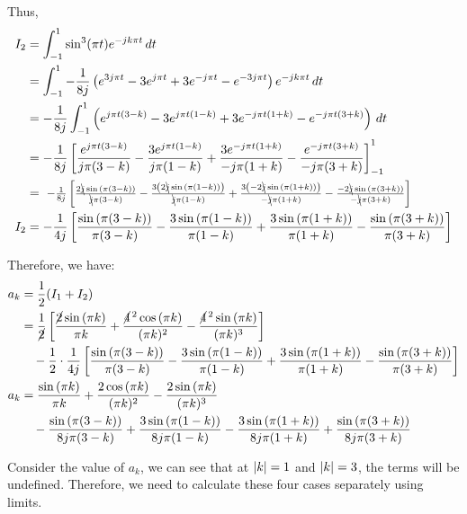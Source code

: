 \documentclass[a4paper, 10pt]{article}
\begin{document}
\begin{tosubmit}
Thus, 
\begin{align*}
    I_2 &= \int_{-1}^{1} \sin^3(\pi t) e^{-j k \pi t} \,dt \\
    &= \int_{-1}^{1} -\frac{1}{8j} \paren{ e^{3j \pi t} - 3e^{j \pi t} + 3e^{-j \pi t} - e^{-3j \pi t} } e^{-j k \pi t} \,dt \\
    &= -\frac{1}{8j} \int_{-1}^{1} \paren{ e^{j \pi t (3 - k)} - 3e^{j \pi t (1 - k)} + 3e^{-j \pi t (1 + k)} - e^{-j \pi t (3 + k)} } \,dt \\
    &= -\frac{1}{8j} \sqbracket{ \frac{e^{j \pi t (3 - k)}}{j \pi (3 - k)} - \frac{3 e^{j \pi t (1 - k)}}{j \pi (1 - k)} + \frac{3 e^{-j \pi t (1 + k)}}{-j \pi (1 + k)} - \frac{e^{-j \pi t (3 + k)}}{-j \pi (3 + k)} }_{-1}^{1} \\
    &= \scalebox{0.90}{ $ -\frac{1}{8j} \sqbracket{ \frac{2\bcancel{j} \sin{(\pi (3 - k))}}{\bcancel{j} \pi (3 - k)} - \frac{3 \paren{ 2\bcancel{j} \sin{(\pi (1 - k))} }}{\bcancel{j} \pi (1 - k)} + \frac{ 3 \paren { -2 \bcancel{j} \sin{(\pi (1 + k))} }}{-\bcancel{j} \pi (1 + k)} - \frac{-2 \bcancel{j} \sin{(\pi (3 + k))}}{-\bcancel{j} \pi (3 + k)} } $ } \\
    I_2 &= -\frac{1}{4j} \sqbracket{ \frac{\sin{(\pi (3 - k))}}{\pi (3 - k)} - \frac{3 \sin{(\pi (1 - k))}}{\pi (1 - k)} + \frac{3 \sin{(\pi (1 + k))}}{\pi (1 + k)} - \frac{\sin{(\pi (3 + k))}}{\pi (3 + k)} }
\end{align*}

Therefore, we have:
\begin{align*}
    a_k &= \frac{1}{2} (I_1 + I_2) \\
    &= \frac{1}{ \cancel{2} } \left[ \frac{ \cancel{2} \sin{(\pi k)}}{\pi k} + \frac{ \cancel{4}^{\, 2} \cos{(\pi k)}}{(\pi k)^2} - \frac { \cancel{4}^{\, 2} \sin{(\pi k)}}{(\pi k)^3} \right] \\
    &\quad - \frac{1}{2} \cdot \frac{1}{4j} \left[ \frac{\sin{(\pi (3 - k))}}{\pi (3 - k)} - \frac{3 \sin{(\pi (1 - k))}}{\pi (1 - k)} + \frac{3 \sin{(\pi (1 + k))}}{\pi (1 + k)} - \frac{\sin{(\pi (3 + k))}}{\pi (3 + k)} \right] \\
    a_k &= \frac{\sin{(\pi k)}}{\pi k} + \frac{2 \cos{(\pi k)}}{(\pi k)^2} - \frac {2 \sin{(\pi k)}}{(\pi k)^3} \\
    &\quad - \frac{\sin{(\pi (3 - k))}}{8j\pi (3 - k)} + \frac{3 \sin{(\pi (1 - k))}}{8j\pi (1 - k)} - \frac{3 \sin{(\pi (1 + k))}}{8j\pi (1 + k)} + \frac{\sin{(\pi (3 + k))}}{8j\pi (3 + k)}
\end{align*}

Consider the value of \( a_k \), we can see that at \( \left| k \right| = 1 \) and \( \left| k \right| = 3 \), the terms will be undefined. Therefore, we need to calculate these four cases separately using limits.


\end{tosubmit}
\end{document}

